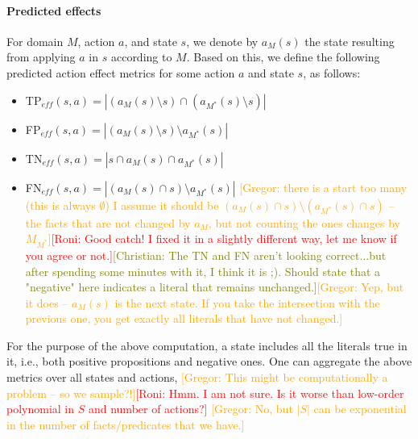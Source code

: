 \documentclass{article}
\theoremstyle{definition}
\theoremstyle{remark}
\newcommand{\realm}{\ensuremath{M^*}\xspace}
\newcommand{\eff}{\ensuremath{\textit{eff}}\xspace}
\newcommand{\roni}[1]{{\textcolor{red}{[Roni: #1]}}}
\newcommand{\yarin}[1]{{\textcolor{teal}{[Yarin: #1]}}}
\newcommand{\gregor}[1]{{\textcolor{orange}{[Gregor: #1]}}}
\newcommand{\cm}[1]{{\textcolor{olive}{[Christian: #1]}}}
\begin{document}
\paragraph{Predicted effects}
For domain $M$, action $a$, and state $s$, we denote by $a_M(s)$ the state resulting from applying $a$ in $s$ according to $M$. 
Based on this, we define the following predicted action effect metrics for some action $a$ and state $s$, as follows: 
\begin{itemize}
    \item TP$_{\eff}(s,a)=|(a_M(s)\setminus s)\cap (a_\realm(s)\setminus s)|$
    \item FP$_{\eff}(s,a)=|(a_M(s)\setminus s)\setminus a_\realm(s)|$ 
    \item TN$_{\eff}(s,a)=|s \cap a_M(s) \cap a_\realm(s)|$
    \item FN$_{\eff}(s,a)=|(a_M(s)\cap s)\setminus a_\realm(s)|$ \gregor{there is a start too many (this is always $\emptyset$) I assume it should be $(a_M(s)\cap s)\setminus (a_\realm(s) \cap s)$ -- the facts that are not changed by $a_M$, but not counting the ones changes by $M_\realm$}\roni{Good catch! I fixed it in a slightly different way, let me know if you agree or not.}\cm{The TN and FN aren't looking correct...but after spending some minutes with it, I think it is ;). Should state that a "negative" here indicates a literal that remains unchanged.}\gregor{Yep, but it does -- $a_M(s)$ is the next state. If you take the intersection with the previous one, you get exactly all literals that have not changed.}
\end{itemize}
For the purpose of the above computation, a state includes all the literals true in it, i.e., both positive propositions and negative ones. 
One can aggregate the above metrics over all states and actions, \gregor{This might be computationally a problem -- so we sample?!}\roni{Hmm. I am not sure. Is it worse than low-order polynomial in $S$ and number of actions?}
\gregor{No, but $|S|$ can be exponential in the number of facts/predicates that we have.}
\end{document}
